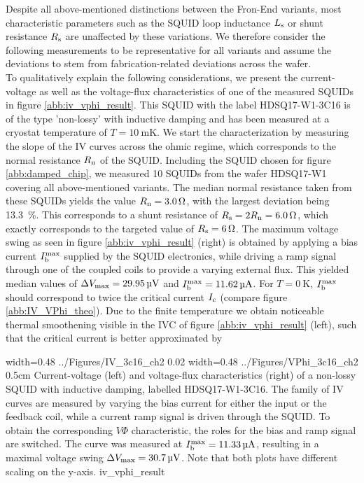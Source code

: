 Despite all above-mentioned distinctions between the Fron-End variants, most characteristic parameters such as the SQUID loop inductance $L_{\rm s}$ or shunt resistance $R_{\rm s}$ are unaffected by these variations. We therefore consider the following measurements to be representative for all variants and assume the deviations to stem from fabrication-related deviations across the wafer. \\
To qualitatively explain the following considerations, we present the current-voltage as well as the voltage-flux characteristics of one of the measured SQUIDs in figure \ref{abb:iv_vphi_result}. This SQUID with the label HDSQ17-W1-3C16 is of the type 'non-lossy' with inductive damping and has been measured at a cryostat temperature of $T=\qty{10}{\milli\kelvin}$. We start the characterization by measuring the slope of the IV curves across the ohmic regime, which corresponds to the normal resistance $R_{\rm n}$ of the SQUID. Including the SQUID chosen for figure \ref{abb:damped_chip}, we measured 10 SQUIDs from the wafer HDSQ17-W1 covering all above-mentioned variants. The median normal resistance taken from these SQUIDs yields the value $R_{\rm n}=\qty{3.0}{\ohm}$, with the largest deviation being \qty{13.3}{\percent}. This corresponds to a shunt resistance of $R_{\rm s}=2R_{\rm n}=\qty{6.0}{\ohm}$, which exactly corresponds to the targeted value of $R_{\rm s}=\qty{6}{\ohm}$. The maximum voltage swing as seen in figure \ref{abb:iv_vphi_result} (right) is obtained by applying a bias current $I_{\rm b}^{\rm max}$ supplied by the SQUID electronics, while driving a ramp signal through one of the coupled coils to provide a varying external flux. This yielded median values of $\Delta V_{\rm max}=\qty{29.95}{\micro\volt}$ and $I_{\rm b}^{\rm max}=\qty{11.62}{\micro\ampere}$. For $T=\qty{0}{\kelvin}$, $I_{\rm b}^{\rm max}$ should correspond to twice the critical current $I_{\rm c}$ (compare figure \ref{abb:IV_VPhi_theo}). Due to the finite temperature we obtain noticeable thermal smoothening visible in the IVC of figure \ref{abb:iv_vphi_result} (left), such that the critical current is better approximated by \cite{Drung1996}

{width=0.48\textwidth}
{../Figures/IV_3c16_ch2}
{0.02\textwidth} %
{width=0.48\textwidth}
{../Figures/VPhi_3c16_ch2}
{0.5cm} %
{Current-voltage (left) and voltage-flux characteristics (right) of a non-lossy SQUID with inductive damping, labelled HDSQ17-W1-3C16. The family of IV curves are measured by varying the bias current for either the input or the feedback coil, while a current ramp signal is driven through the SQUID. To obtain the corresponding $V\Phi$ characteristic, the roles for the bias and ramp signal are switched. The curve was measured at $I_{\rm b}^{\rm max}=\qty{11.33}{\uA}$, resulting in a maximal voltage swing $\Delta V_{\rm max}=\qty{30.7}{\uV}$. Note that both plots have different scaling on the y-axis.}
{iv_vphi_result}


